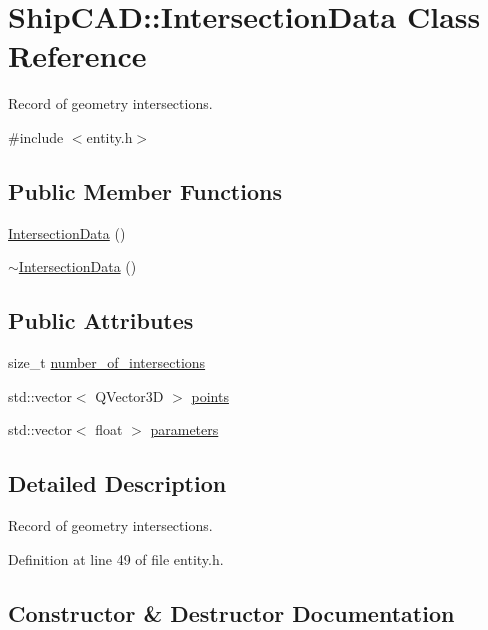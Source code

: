\hypertarget{classShipCAD_1_1IntersectionData}{}\section{Ship\+C\+AD\+:\+:Intersection\+Data Class Reference}
\label{classShipCAD_1_1IntersectionData}


Record of geometry intersections.  




{\ttfamily \#include $<$entity.\+h$>$}

\subsection*{Public Member Functions}
\begin{DoxyCompactItemize}
\item 
\hyperlink{classShipCAD_1_1IntersectionData_acc582d8820d6e60117e0bf5fe686ab76}{Intersection\+Data} ()
\item 
\hyperlink{classShipCAD_1_1IntersectionData_a80ee22151368715711e3713eae61d401}{$\sim$\+Intersection\+Data} ()
\end{DoxyCompactItemize}
\subsection*{Public Attributes}
\begin{DoxyCompactItemize}
\item 
size\+\_\+t \hyperlink{classShipCAD_1_1IntersectionData_a5b42e3b8b81d18963f9a07609b402628}{number\+\_\+of\+\_\+intersections}
\item 
std\+::vector$<$ Q\+Vector3D $>$ \hyperlink{classShipCAD_1_1IntersectionData_a926e126e42d95e01b39e2750a0e1fb95}{points}
\item 
std\+::vector$<$ float $>$ \hyperlink{classShipCAD_1_1IntersectionData_a06fcbb71243644bdea0e5b86da3b191c}{parameters}
\end{DoxyCompactItemize}


\subsection{Detailed Description}
Record of geometry intersections. 

Definition at line 49 of file entity.\+h.



\subsection{Constructor \& Destructor Documentation}
